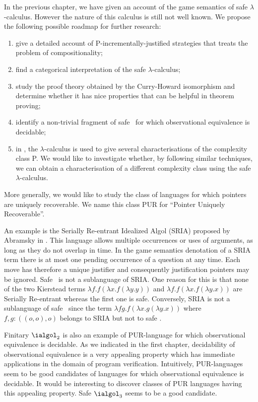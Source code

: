 In the previous chapter, we have given an account of the game
semantics of safe $\lambda$-calculus. However the nature of this
calculus is still not well known. We propose the following possible
roadmap for further research:
\begin{enumerate}
\item give a detailed account of
P-incrementally-justified strategies that treats the problem of compositionality;
\item find a categorical interpretation of the safe $\lambda$-calculus;
\item study the proof theory obtained by the Curry-Howard isomorphism and determine whether it has nice properties that can be helpful in theorem proving;
\item identify a non-trivial fragment of safe \ialgol\ for which observational equivalence is decidable;
\item in \cite{DBLP:conf/tlca/LeivantM93}, the $\lambda$-calculus is used to
give several characterisations of the complexity class P. We would
like to investigate whether, by following similar techniques, we can
obtain a characterisation of a different complexity class using the
safe $\lambda$-calculus.
\end{enumerate}


More generally, we would like to study the class of languages for
which pointers are uniquely recoverable. We name this class PUR for
``Pointer Uniquely Recoverable''.

An example is the Serially Re-entrant Idealized Algol (SRIA) proposed
by Abramsky  in \cite{abramsky:mchecking_ia}. This language allows
multiple occurrences or uses of arguments, as long as they do not
overlap in time. In the game semantics denotation of a SRIA term
there is at most one pending occurrence of a question at any time.
Each move has therefore a unique justifier and consequently
justification pointers may be ignored. Safe \ialgol\ is not a
sublanguage of SRIA. One reason for this is that none of the two
Kierstead terms $\lambda f . f (\lambda x . f (\lambda y .y ))$ and
$\lambda f . f (\lambda x . f (\lambda y .x ))$ are Serially
Re-entrant whereas the first one is safe. Conversely, SRIA is not a
sublanguage of safe \ialgol\ since the term $\lambda f g. f (\lambda
x . g (\lambda y .x ))$ where $f,g:((o,o),o)$ belongs to SRIA but
not to safe \ialgol.

Finitary $\ialgol_2$ is also an example of PUR-language for which
observational equivalence is decidable. As we indicated in the first
chapter, decidability of observational equivalence is a very
appealing property which has immediate applications in the domain of
program verification. Intuitively, PUR-languages seem to be good
candidates of languages for which observational equivalence is decidable. It would be interesting to discover classes of PUR
languages having this appealing property. Safe $\ialgol_3$ seems to be a good candidate.

